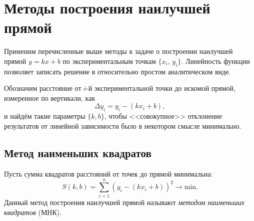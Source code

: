 %
%

\section{Методы построения наилучшей прямой}
Применим перечисленные выше методы к задаче о построении наилучшей прямой
$y=kx+b$ по экспериментальным точкам $\{x_i,\,y_i\}$.
Линейность функции позволяет записать решение в относительно
простом аналитическом виде.

Обозначим расстояние от $i$-й экспериментальной точки до искомой прямой,
измеренное по вертикали, как
\[
\Delta y_{i}=y_{i}-\left(kx_{i}+b\right),
\]
и найдём такие параметры $\{k,b\}$, чтобы <<совокупное>> отклонение
результатов от линейной зависимости было в некотором смысле минимально.

\subsection{Метод наименьших квадратов}\label{sec:MNK}
\label{sec:linear}
Пусть сумма квадратов расстояний от точек до прямой минимальна:
\begin{equation}\label{eq:mnk_S}
S\!\left(k,b\right)=
\sum\limits _{i=1}^{n}(y_i-(kx_i+b))^{2}\to\mathrm{min}.
\end{equation}
Данный метод построения наилучшей прямой называют \emph{методом наименьших
квадратов} (МНК).

